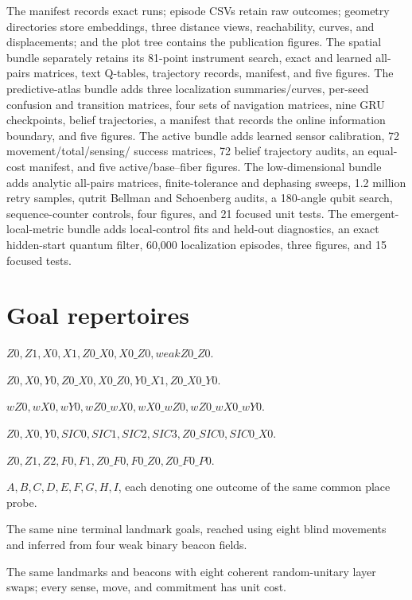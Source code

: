 \documentclass[11pt]{article}
\begin{document}
The manifest records exact runs; episode CSVs retain raw outcomes; geometry
directories store embeddings, three distance views, reachability, curves, and
displacements; and the plot tree contains the publication figures.
The spatial bundle separately retains its 81-point instrument search, exact and
learned all-pairs matrices, text Q-tables, trajectory records, manifest, and
five figures.
The predictive-atlas bundle adds three localization summaries/curves, per-seed
confusion and transition matrices, four sets of navigation matrices, nine GRU
checkpoints, belief trajectories, a manifest that records the online
information boundary, and five figures.
The active bundle adds learned sensor calibration, 72 movement/total/sensing/
success matrices, 72 belief trajectory audits, an equal-cost manifest, and
five active/base--fiber figures.
The low-dimensional bundle adds analytic all-pairs matrices, finite-tolerance
and dephasing sweeps, 1.2 million retry samples, qutrit Bellman and Schoenberg
audits, a 180-angle qubit search, sequence-counter controls, four figures, and
21 focused unit tests.
The emergent-local-metric bundle adds local-control fits and held-out
diagnostics, an exact hidden-start quantum filter, 60,000 localization
episodes, three figures, and 15 focused tests.

\section{Goal repertoires}

\begin{description}[style=nextline]
\item[qubit-zx-weak] $Z0,Z1,X0,X1,Z0\_X0,X0\_Z0,weakZ0\_Z0$.
\item[qubit-pauli] $Z0,X0,Y0,Z0\_X0,X0\_Z0,Y0\_X1,Z0\_X0\_Y0$.
\item[qubit-unsharp] $wZ0,wX0,wY0,wZ0\_wX0,wX0\_wZ0,wZ0\_wX0\_wY0$.
\item[qubit-pauli-sic] $Z0,X0,Y0,SIC0,SIC1,SIC2,SIC3,Z0\_SIC0,SIC0\_X0$.
\item[qutrit-mub] $Z0,Z1,Z2,F0,F1,Z0\_F0,F0\_Z0,Z0\_F0\_P0$.
\item[spatial worlds] $A,B,C,D,E,F,G,H,I$, each denoting one outcome of the
same common place probe.
\item[predictive-atlas worlds] The same nine terminal landmark goals, reached
using eight blind movements and inferred from four weak binary beacon fields.
\item[active-atlas worlds] The same landmarks and beacons with eight coherent
random-unitary layer swaps; every sense, move, and commitment has unit cost.
\end{description}
\end{document}

